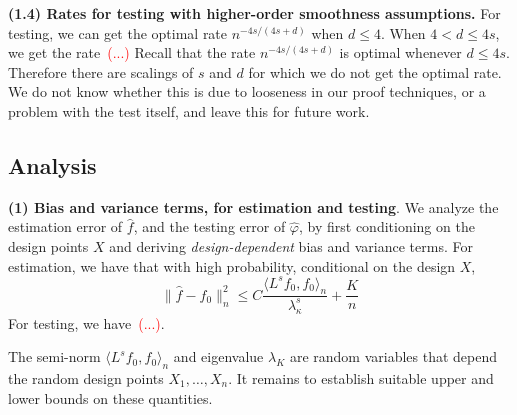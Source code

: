 \documentclass{article}
\newcommand{\1}{\mathbf{1}}
\newcommand{\dotp}[2]{\langle #1, #2 \rangle}
\newcommand{\wh}[1]{\widehat{#1}}
\theoremstyle{alden}
\theoremstyle{aldenthm}
\theoremstyle{definition}
\theoremstyle{remark}
\begin{document}
\textbf{(1.4) Rates for testing with higher-order smoothness assumptions.} For testing, we can get the optimal rate $n^{-4s/(4s + d)}$ when $d \leq 4$. When $4 < d \leq 4s$, we get the rate~\textcolor{red}{(...)} Recall that the rate $n^{-4s/(4s + d)}$ is optimal whenever $d \leq 4s$. Therefore there are scalings of $s$ and $d$ for which we do not get the optimal rate. We do not know whether this is due to looseness in our proof techniques, or a problem with the test itself, and leave this for future work. 

\subsection{Analysis}
\label{sec:analysis}

\textbf{(1) Bias and variance terms, for estimation and testing}. We analyze the estimation error of $\wh{f}$, and the testing error of $\wh{\varphi}$, by first conditioning on the design points $X$ and deriving \emph{design-dependent} bias and variance terms. For estimation, we have that with high probability, conditional on the design $X$,
\begin{equation*}
\|\wh{f} - f_0\|_n^2 \leq C\frac{\dotp{L^s f_0}{f_0}_n}{\lambda_{\kappa}^s} + \frac{K}{n}
\end{equation*}
For testing, we have~\textcolor{red}{(...)}.

The semi-norm $\dotp{L^s f_0}{f_0}_n$ and eigenvalue $\lambda_{K}$ are random variables that depend the random design points $X_1,\ldots,X_n$. It remains to establish suitable upper and lower bounds on these quantities. 
\end{document}
